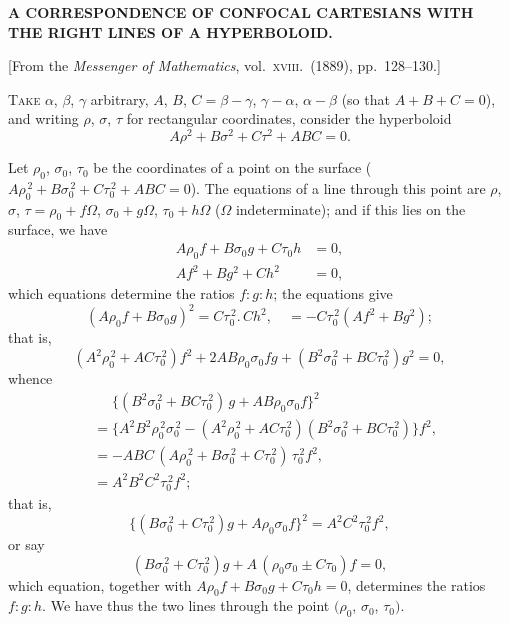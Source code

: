 \documentclass[11pt,a4paper]{article}
\theoremstyle{plain}
\theoremstyle{definition}
\begin{document}
\begin{center}
\textbf{A CORRESPONDENCE OF CONFOCAL CARTESIANS WITH THE RIGHT LINES OF A HYPERBOLOID.}
\end{center}

\begin{center}
[From the \textit{Messenger of Mathematics}, vol.\ \textsc{xviii}.\ (1889), pp.\ 128--130.]
\end{center}

\textsc{Take} $\alpha$, $\beta$, $\gamma$ arbitrary, $A$, $B$, $C = \beta-\gamma$, $\gamma-\alpha$, $\alpha-\beta$ (so that $A+B+C=0$), and writing $\rho$, $\sigma$, $\tau$ for rectangular coordinates, consider the hyperboloid
\[ A\rho^2 + B\sigma^2 + C\tau^2 + ABC = 0. \]

Let $\rho_0$, $\sigma_0$, $\tau_0$ be the coordinates of a point on the surface ($A\rho_0^{\,2} + B\sigma_0^{\,2} + C\tau_0^{\,2} + ABC = 0$). The equations of a line through this point are $\rho$, $\sigma$, $\tau = \rho_0 + f\Omega$, $\sigma_0 + g\Omega$, $\tau_0 + h\Omega$ ($\Omega$ indeterminate); and if this lies on the surface, we have
\begin{align*}
A\rho_0 f + B\sigma_0 g + C\tau_0 h &= 0, \\
Af^2 + Bg^2 + Ch^2 &= 0,
\end{align*}
which equations determine the ratios $f : g : h$; the equations give
\[ (A\rho_0 f + B\sigma_0 g)^2 = C\tau_0^{\,2} .\, Ch^2, \quad = -C\tau_0^{\,2}(Af^2 + Bg^2); \]
that is,
\[ (A^2\rho_0^{\,2} + AC\tau_0^{\,2})f^2 + 2AB\rho_0\sigma_0 fg + (B^2\sigma_0^{\,2} + BC\tau_0^{\,2})g^2 = 0, \]
whence
\begin{align*}
&\phantom{=} \{(B^2\sigma_0^{\,2} + BC\tau_0^{\,2})\, g + AB\rho_0\sigma_0 f \}^2 \\
&= \{A^2B^2\rho_0^{\,2}\sigma_0^{\,2} - (A^2\rho_0^{\,2} + AC\tau_0^{\,2})(B^2\sigma_0^{\,2} + BC\tau_0^{\,2})\} f^2, \\
&= -ABC\,(A\rho_0^{\,2} + B\sigma_0^{\,2} + C\tau_0^{\,2})\, \tau_0^{\,2} f^2, \\
&= A^2B^2C^2 \tau_0^{\,2} f^2;
\end{align*}
that is,
\[ \{(B\sigma_0^{\,2} + C\tau_0^{\,2})g + A\rho_0\sigma_0 f\}^2 = A^2C^2\tau_0^{\,2} f^2, \]
or say
\[ (B\sigma_0^{\,2} + C\tau_0^{\,2})g + A\,(\rho_0\sigma_0 \pm C\tau_0)f = 0, \]
which equation, together with $A\rho_0 f + B\sigma_0 g + C\tau_0 h = 0$, determines the ratios $f : g : h$. We have thus the two lines through the point $(\rho_0$, $\sigma_0$, $\tau_0)$.
\end{document}
